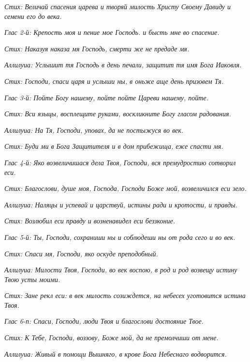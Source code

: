 \itshape Стих:\normalfont{} Величай спасения царева и творяй милость Христу Своему Давиду и семени его до века.


\itshape Глас 2-й:\normalfont{} Крепость моя и пение мое Господь. и бысть мне во спасение.


\itshape Стих:\normalfont{} Наказуя наказа мя Господь, смерти же не предаде мя.


\itshape Аллилуиа:\normalfont{} Услышит тя Господь в день печали, защитит тя имя Бога Иаковля.


\itshape Стих:\normalfont{} Господи, спаси царя и услыши ны, в оньже аще день призовем Тя.


\itshape Глас 3-й:\normalfont{} Пойте Богу нашему, пойте пойте Цареви нашему, пойте.


\itshape Стих:\normalfont{} Вси языцы, восплещите руками, воскликните Богу гласом радования.


\itshape Аллилуиа:\normalfont{} На Тя, Господи, уповах, да не постыжуся во век.


\itshape Стих:\normalfont{} Буди ми в Бога Защитителя и в дом прибежища, еже спасти мя.


\itshape Глас 4-й:\normalfont{} Яко возвеличишася дела Твоя, Господи, вся премудростию сотворил еси.


\itshape Стих:\normalfont{} Благослови, душе моя, Господа, Господи Боже мой, возвеличился еси зело.


\itshape Аллилуиа:\normalfont{} Наляцы и успевай и царствуй, истины ради и кротости, и правды.


\itshape Стих:\normalfont{} Возлюбил еси правду и возненавидел еси беззконие.


\itshape Глас 5-й:\normalfont{} Ты, Господи, сохраниши ны и соблюдеши ны от рода сего и во век.


\itshape Стих:\normalfont{} Спаси мя, Господи, яко оскуде преподобный.


\itshape Аллилуиа:\normalfont{} Милости Твоя, Господи, во век воспою, в род и род возвещу истину Твою усты моими.


\itshape Стих:\normalfont{} Зане рекл еси: в век милость созиждется, на небесех уготовится истина Твоя.


\itshape Глас 6-п:\normalfont{} Спаси, Господи, люди Твоя и благослови достояние Твое.


\itshape Стих:\normalfont{} К Тебе, Господи, воззову, Боже мой, да не премолчиши от мене.


\itshape Аллилуиа:\normalfont{} Живый в помощи Вышняго, в крове Бога Небеснаго водворится.


